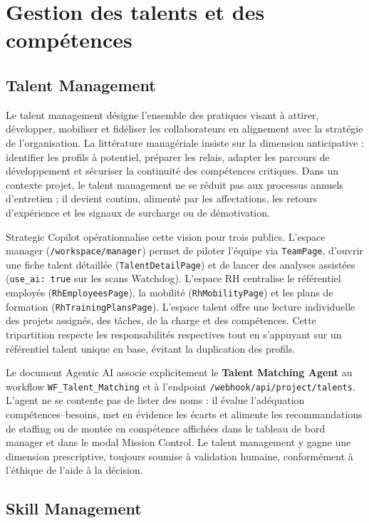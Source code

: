 \section{Gestion des talents et des compétences}

\subsection{Talent Management}

Le talent management \cite{silzer2010,becker2009} désigne l'ensemble des pratiques visant à attirer, développer, mobiliser et fidéliser les collaborateurs en alignement avec la stratégie de l'organisation. La littérature managériale insiste sur la dimension anticipative : identifier les profils à potentiel, préparer les relais, adapter les parcours de développement et sécuriser la continuité des compétences critiques. Dans un contexte projet, le talent management ne se réduit pas aux processus annuels d'entretien ; il devient continu, alimenté par les affectations, les retours d'expérience et les signaux de surcharge ou de démotivation.

Strategic Copilot opérationnalise cette vision pour trois publics. L'espace manager (\texttt{/workspace/manager}) permet de piloter l'équipe via \texttt{TeamPage}, d'ouvrir une fiche talent détaillée (\texttt{TalentDetailPage}) et de lancer des analyses assistées (\texttt{use\_ai: true} sur les scans Watchdog). L'espace RH centralise le référentiel employés (\texttt{RhEmployeesPage}), la mobilité (\texttt{RhMobilityPage}) et les plans de formation (\texttt{RhTrainingPlansPage}). L'espace talent offre une lecture individuelle des projets assignés, des tâches, de la charge et des compétences. Cette tripartition respecte les responsabilités respectives tout en s'appuyant sur un référentiel talent unique en base, évitant la duplication des profils.

Le document Agentic AI associe explicitement le \textbf{Talent Matching Agent} au workflow \texttt{WF\_Talent\_Matching} et à l'endpoint \texttt{/webhook/api/project/talents}. L'agent ne se contente pas de lister des noms : il évalue l'adéquation compétences--besoins, met en évidence les écarts et alimente les recommandations de staffing ou de montée en compétence affichées dans le tableau de bord manager et dans le modal Mission Control. Le talent management y gagne une dimension prescriptive, toujours soumise à validation humaine, conformément à l'éthique de l'aide à la décision.

\subsection{Skill Management}

